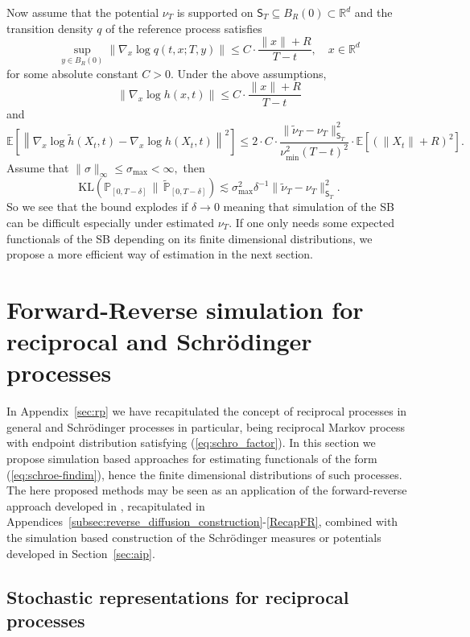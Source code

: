 \documentclass[a4paper,11pt]{amsart}
\theoremstyle{plain}
\theoremstyle{remark}
\begin{document}
Now assume that the potential \( \nu_T \) is supported on \( \mathsf{S}_T \subseteq B_R(0) \subset \mathbb{R}^d \)
and the transition density \(q\) of the reference process satisfies
\[
    \sup_{y \in B_R(0)} \| \nabla_x \log q(t,x;T,y) \| \leq C\cdot\frac{\|x\| + R}{T - t}, \quad x\in \mathbb{R}^d
\]    
for some absolute constant \(C>0.\)  Under the above assumptions,
\[
\left\| \nabla_x \log h(x,t) \right\| \leq C \cdot \frac{\|x\| + R}{T - t} 
\]
and 
\[
\mathbb{E} \left[ \left\| \nabla_x \log \widetilde{h}(X_t,t) - \nabla_x \log h(X_t,t) \right\|^2 \right]
\leq 2\cdot C\cdot \frac{\| \widetilde{\nu}_T - \nu_T \|_{\mathsf{S}_T}^2}{\nu_{\min}^2 (T - t)^2} \cdot \mathbb{E} \left[ (\|X_t\| + R)^2 \right].
\]
Assume that $\|\sigma\|_{\infty}\leq \sigma_{\max}<\infty,$ then
\[
\mathrm{KL}(\mathbb{P}_{[0,T-\delta]} \,\|\, \widetilde{\mathbb{P}}_{[0,T-\delta]})\lesssim \sigma_{\max}^2\delta^{-1}\| \widetilde{\nu}_T - \nu_T \|_{\mathsf{S}_T}^2. 
\]
So we see that the bound explodes if $\delta\to 0$ meaning that simulation of the SB can be difficult especially under estimated $\nu_T.$ If one only needs some expected functionals of the SB depending on its finite dimensional distributions, we propose a more efficient way  of estimation in the next section.
\section{Forward-Reverse simulation for reciprocal and Schr\"{o}dinger processes}
\label{FRSP} 

In Appendix~\ref{sec:rp} we have recapitulated the concept of reciprocal processes
in general and  Schr\"{o}dinger processes in particular, being reciprocal Markov process with endpoint distribution 
satisfying  (\ref{eq:schro_factor}).
In this section we propose simulation based approaches for
estimating functionals of the form (\ref{eq:schroe-findim}), hence the finite dimensional distributions of such processes. The here proposed methods may be seen as an application of the forward-reverse approach developed 
in \cite{BS2014}, recapitulated in Appendices~\ref{subsec:reverse_diffusion_construction}-\ref{RecapFR}, combined  with the simulation based construction of the   Schr\"{o}dinger measures or potentials developed in Section~\ref{sec:aip}.

\subsection{Stochastic representations for reciprocal processes}
\end{document}
